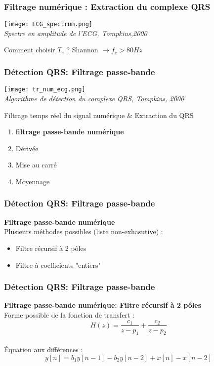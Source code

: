 \documentclass{beamer}
\begin{document}
\begin{frame}
\frametitle{Filtrage numérique :  Extraction du complexe QRS}
\begin{center}
\texttt{[image: ECG\_spectrum.png]}\\
\textit{\scriptsize Spectre en amplitude de l'ECG, Tompkins,2000}\\
\vspace{0.1cm}
\end{center}
Comment choisir $T_e$ ?  {Shannon $\rightarrow f_e > 80 Hz$   }


\end{frame}

\begin{frame}
\frametitle{Détection QRS: Filtrage passe-bande}
\begin{center}
\texttt{[image: tr\_num\_ecg.png]}\\
\textit{\footnotesize Algorithme de détection du complexe QRS, Tompkins, 2000}\\
\vspace{0.3cm}
\end{center}
Filtrage temps réel du signal numérique \& Extraction du QRS
\begin{enumerate}
\item \textbf{filtrage passe-bande numérique}
\item Dérivée 
\item Mise au carré 
\item Moyennage
\end{enumerate}
\end{frame}

\begin{frame}
\frametitle{Détection QRS: Filtrage passe-bande}
 \textbf{Filtrage passe-bande numérique}\\
 \vspace{0.3 cm}
 Plusieurs méthodes possibles (liste non-exhasutive) :\\
 \vspace{0.2cm}
 \begin{itemize}
 \item Filtre récursif à  2 pôles
 \vspace{0.2cm}
 \item Filtre à coefficients "entiers"
 \vspace{0.2cm}
 \end{itemize}
\end{frame}

\begin{frame}
\frametitle{Détection QRS: Filtrage passe-bande}
 \textbf{Filtrage passe-bande numérique: Filtre récursif à  2 pôles}\\
 \vspace{0.3 cm}
 Forme possible de la fonction de transfert :
 \[H(z) = \frac{c_1}{z-p_1} + \frac{c_2}{z-p_2} \]\\
  \vspace{0.3 cm}
  \'Equation aux différences :
 \[y[n] = b_1 y[n-1] - b_2 y[n-2] + x[n] - x[n-2] \]  
\end{frame}
\end{document}
